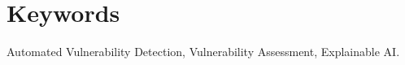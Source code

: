 \documentclass[11pt]{article}
\begin{document}
\section{Keywords}
Automated Vulnerability Detection, Vulnerability Assessment,
Explainable AI.




\end{document}
